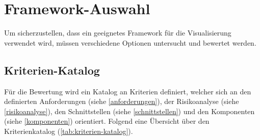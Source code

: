 \section{Framework-Auswahl}
Um sicherzustellen, dass ein geeignetes \gls{Framework} für die Visualisierung verwendet wird, müssen verschiedene Optionen untersucht und bewertet werden.

\subsection{Kriterien-Katalog}
Für die Bewertung wird ein Katalog an Kriterien definiert, welcher sich an den definierten Anforderungen (siehe \autoref{anforderungen}), der Risikoanalyse (siehe \autoref{risikoanalyse}), den Schnittstellen (siehe \autoref{schnittstellen}) und den Komponenten (siehe \autoref{komponenten}) orientiert. Folgend eine Übersicht über den Kriterienkatalog (\autoref{tab:kriterien-katalog}). 

